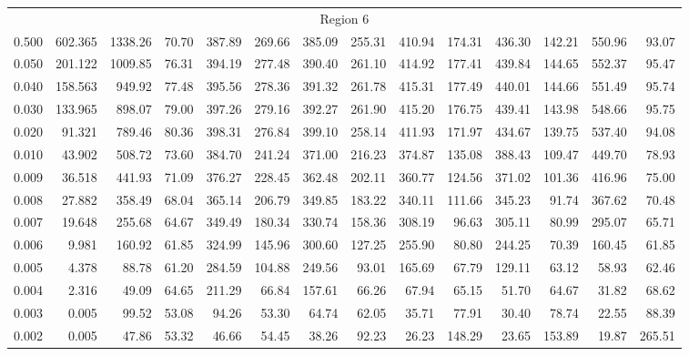 \begin{tabular}{@{}lrrrrrrrrrrrrr@{}}
\midrule
\multicolumn{14}{c}{Region 6} \\
\cmidrule{1-14}
0.500 & 602.365 & 1338.26 & 70.70 & 387.89 & 269.66 & 385.09 & 255.31 & 410.94 & 174.31 & 436.30 & 142.21 & 550.96 & 93.07 \\
0.050 & 201.122 & 1009.85 & 76.31 & 394.19 & 277.48 & 390.40 & 261.10 & 414.92 & 177.41 & 439.84 & 144.65 & 552.37 & 95.47 \\
0.040 & 158.563 & 949.92 & 77.48 & 395.56 & 278.36 & 391.32 & 261.78 & 415.31 & 177.49 & 440.01 & 144.66 & 551.49 & 95.74 \\
0.030 & 133.965 & 898.07 & 79.00 & 397.26 & 279.16 & 392.27 & 261.90 & 415.20 & 176.75 & 439.41 & 143.98 & 548.66 & 95.75 \\
0.020 & 91.321 & 789.46 & 80.36 & 398.31 & 276.84 & 399.10 & 258.14 & 411.93 & 171.97 & 434.67 & 139.75 & 537.40 & 94.08 \\
0.010 & 43.902 & 508.72 & 73.60 & 384.70 & 241.24 & 371.00 & 216.23 & 374.87 & 135.08 & 388.43 & 109.47 & 449.70 & 78.93 \\
0.009 & 36.518 & 441.93 & 71.09 & 376.27 & 228.45 & 362.48 & 202.11 & 360.77 & 124.56 & 371.02 & 101.36 & 416.96 & 75.00 \\
0.008 & 27.882 & 358.49 & 68.04 & 365.14 & 206.79 & 349.85 & 183.22 & 340.11 & 111.66 & 345.23 & 91.74 & 367.62 & 70.48 \\
0.007 & 19.648 & 255.68 & 64.67 & 349.49 & 180.34 & 330.74 & 158.36 & 308.19 & 96.63 & 305.11 & 80.99 & 295.07 & 65.71 \\
0.006 & 9.981 & 160.92 & 61.85 & 324.99 & 145.96 & 300.60 & 127.25 & 255.90 & 80.80 & 244.25 & 70.39 & 160.45 & 61.85 \\
0.005 & 4.378 & 88.78 & 61.20 & 284.59 & 104.88 & 249.56 & 93.01 & 165.69 & 67.79 & 129.11 & 63.12 & 58.93 & 62.46 \\
0.004 & 2.316 & 49.09 & 64.65 & 211.29 & 66.84 & 157.61 & 66.26 & 67.94 & 65.15 & 51.70 & 64.67 & 31.82 & 68.62 \\
0.003 & 0.005 & 99.52 & 53.08 & 94.26 & 53.30 & 64.74 & 62.05 & 35.71 & 77.91 & 30.40 & 78.74 & 22.55 & 88.39 \\
0.002 & 0.005 & 47.86 & 53.32 & 46.66 & 54.45 & 38.26 & 92.23 & 26.23 & 148.29 & 23.65 & 153.89 & 19.87 & 265.51 \\


\end{tabular}
